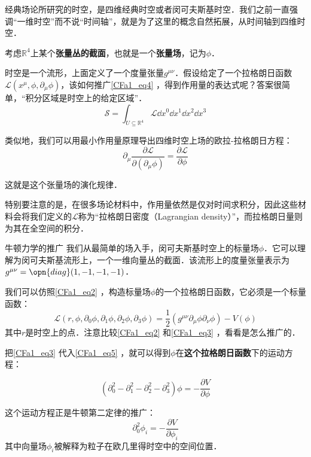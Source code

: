 经典场论所研究的时空，是四维经典时空或者闵可夫斯基时空．我们之前一直强调“一维时空”而不说“时间轴”，就是为了这里的概念自然拓展，从时间轴到四维时空．



考虑$\mathbb{R}^4$上某个\textbf{张量丛的截面}，也就是一个\textbf{张量场}，记为$\phi$．

时空是一个流形，上面定义了一个度量张量$g^{\mu\nu}$．假设给定了一个拉格朗日函数$\mathcal{L}(x^\mu, \phi, \partial_\mu\phi)$，该如何推广\autoref{CFa1_eq4} ，得到作用量的表达式呢？答案很简单，“积分区域是时空上的给定区域”．
\begin{equation}
\mathcal{S} = \int_{U\subseteq \mathbb{R}^4} \mathcal{L}\dd x^0\dd x^1\dd x^2\dd x^3
\end{equation}

类似地，我们可以用最小作用量原理导出四维时空上场的欧拉-拉格朗日方程：
\begin{equation}\label{CFa1_eq5}
\partial_\mu \frac{\partial\mathcal{L}}{\partial(\partial_\mu \phi)} = \frac{\partial\mathcal{L}}{\partial \phi}
\end{equation}

这就是这个张量场的演化规律．

特别要注意的是，在很多场论材料中，作用量依然是仅对时间求积分，因此这些材料会将我们定义的$\mathcal{L}$称为“拉格朗日密度（Lagrangian density）”，而拉格朗日量则为其在全空间的积分．

\begin{example}{牛顿力学的推广}\label{CFa1_ex1}
我们从最简单的场入手，闵可夫斯基时空上的标量场$\phi$．它可以理解为闵可夫斯基流形上，一个一维向量丛的截面．该流形上的度量张量表示为$g^{\mu\nu}=\opn{diag}(1, -1, -1, -1)$．

我们可以仿照\autoref{CFa1_eq2} ，构造标量场$\phi$的一个拉格朗日函数，它必须是一个标量函数：
\begin{equation}\label{CFa1_eq3}
\mathcal{L}(r, \phi, \partial_0\phi, \partial_1\phi, \partial_2\phi, \partial_3\phi) = \frac{1}{2}(g^{\mu\nu}\partial_\mu\phi \partial_\nu\phi) - V(\phi)
\end{equation}
其中$r$是时空上的点．注意比较\autoref{CFa1_eq2} 和\autoref{CFa1_eq3} ，看看是怎么推广的．

把\autoref{CFa1_eq3} 代入\autoref{CFa1_eq5} ，就可以得到$\phi$在\textbf{这个拉格朗日函数}下的运动方程：

\begin{equation}
(\partial^2_0-\partial^2_1-\partial^2_2-\partial^2_3)\phi = -\frac{\partial V}{\partial \phi}
\end{equation}

这个运动方程正是牛顿第二定律的推广：
\begin{equation}
\partial^2_0 \phi_i = -\frac{\partial V}{\partial \phi_i}
\end{equation}
其中向量场$\phi_i$被解释为粒子在欧几里得时空中的空间位置．

\end{example}



